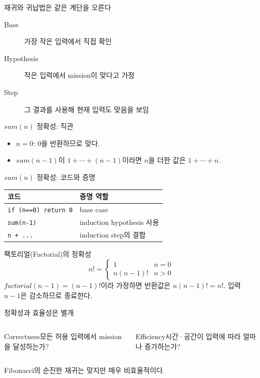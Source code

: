 \begin{frame}{재귀와 귀납법은 같은 계단을 오른다}\begin{description}\item[Base]가장 작은 입력에서 직접 확인\item[Hypothesis]작은 입력에서 mission이 맞다고 가정\item[Step]그 결과를 사용해 현재 입력도 맞음을 보임\end{description}
\end{frame}
\begin{frame}{$sum(n)$ 정확성: 직관}\begin{itemize}\item $n=0$: 0을 반환하므로 맞다.\item $sum(n-1)$이 $1+\cdots+(n-1)$이라면 $n$을 더한 값은 $1+\cdots+n$.\end{itemize}
\end{frame}
\begin{frame}{$sum(n)$ 정확성: 코드와 증명}\begin{tabular}{@{}ll@{}}\toprule 코드 & 증명 역할\\\midrule\texttt{if (n==0) return 0} & base case\\\texttt{sum(n-1)} & induction hypothesis 사용\\\texttt{n + ...} & induction step의 결합\\\bottomrule\end{tabular}
\end{frame}
\begin{frame}{팩토리얼(Factorial)의 정확성}\[n!=\begin{cases}1&n=0\\n(n-1)!&n>0\end{cases}\]\small $factorial(n-1)=(n-1)!$이라 가정하면 반환값은 $n(n-1)!=n!$. 입력 $n-1$은 감소하므로 종료한다.
\end{frame}
\begin{frame}{정확성과 효율성은 별개}\begin{columns}[T]\begin{block}{Correctness}모든 허용 입력에서 mission을 달성하는가?\end{block}\begin{block}{Efficiency}시간·공간이 입력에 따라 얼마나 증가하는가?\end{block}\end{columns}\vfill Fibonacci의 순진한 재귀는 맞지만 매우 비효율적이다.
\end{frame}
